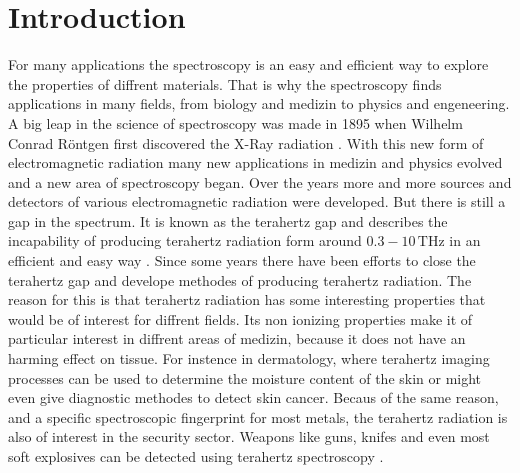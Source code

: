 \chapter{Introduction}
For many applications the spectroscopy is an easy and efficient way to explore the properties of diffrent materials.
That is why the spectroscopy finds applications in many fields, from biology and medizin to physics and engeneering.
A big leap in the science of spectroscopy was made in 1895 when Wilhelm Conrad Röntgen first discovered the X-Ray radiation \cite{roentgen}.
With this new form of electromagnetic radiation many new applications in medizin and physics evolved and a new area of spectroscopy began.
Over the years more and more sources and detectors of various electromagnetic radiation were developed.
But there is still a gap in the spectrum.
It is known as the terahertz gap and describes the incapability of producing terahertz radiation form around $0.3-10\,\si{\tera\hertz}$ in an efficient and easy way \cite[157--159]{THzgap_applications}.
Since some years there have been efforts to close the terahertz gap and develope methodes of producing terahertz radiation.
The reason for this is that terahertz radiation has some interesting properties that would be of interest for diffrent fields.
Its non ionizing properties make it of particular interest in diffrent areas of medizin, because it does not have an harming effect on tissue\cite[161--162]{THzgap_applications}.
For instence in dermatology, where terahertz imaging processes can be used to determine the moisture content of the skin or might even give diagnostic methodes to detect skin cancer\cite{terahertz_dermatology}. 
Becaus of the same reason, and a specific spectroscopic fingerprint for most metals, the terahertz radiation is also of interest in the security sector.
Weapons like guns, knifes and even most soft explosives can be detected using terahertz spectroscopy \cite[162]{THzgap_applications}\cite{thz_explosive_detec}.


